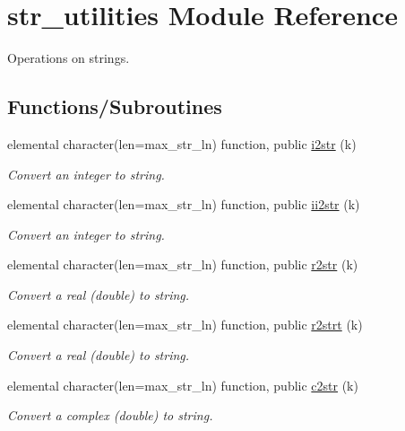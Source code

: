\hypertarget{namespacestr__utilities}{}\section{str\+\_\+utilities Module Reference}
\label{namespacestr__utilities}


Operations on strings.  


\subsection*{Functions/\+Subroutines}
\begin{DoxyCompactItemize}
\item 
elemental character(len=max\+\_\+str\+\_\+ln) function, public \hyperlink{namespacestr__utilities_a0b97e51770725a3e98ed393d26681414}{i2str} (k)
\begin{DoxyCompactList}\small\item\em Convert an integer to string. \end{DoxyCompactList}\item 
elemental character(len=max\+\_\+str\+\_\+ln) function, public \hyperlink{namespacestr__utilities_acb8c4e66aead51f178e47fdea8d7a7db}{ii2str} (k)
\begin{DoxyCompactList}\small\item\em Convert an integer to string. \end{DoxyCompactList}\item 
elemental character(len=max\+\_\+str\+\_\+ln) function, public \hyperlink{namespacestr__utilities_a92ac6c0af1979df094de1caddd28ade0}{r2str} (k)
\begin{DoxyCompactList}\small\item\em Convert a real (double) to string. \end{DoxyCompactList}\item 
elemental character(len=max\+\_\+str\+\_\+ln) function, public \hyperlink{namespacestr__utilities_ac778d706b2e021672618939ab58fdd32}{r2strt} (k)
\begin{DoxyCompactList}\small\item\em Convert a real (double) to string. \end{DoxyCompactList}\item 
elemental character(len=max\+\_\+str\+\_\+ln) function, public \hyperlink{namespacestr__utilities_a308e943e5e244e3e0f852f2ecb3e3183}{c2str} (k)
\begin{DoxyCompactList}\small\item\em Convert a complex (double) to string. \end{DoxyCompactList}\item 

\end{DoxyCompactItemize}
